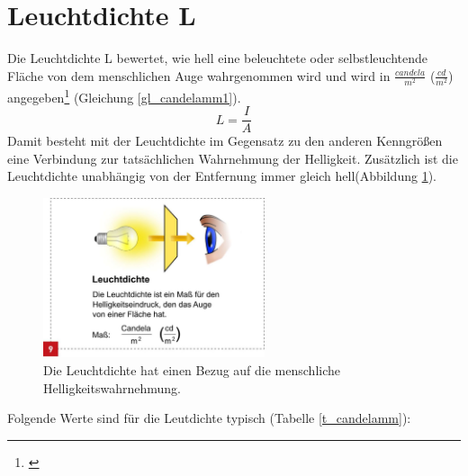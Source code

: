 \section{Leuchtdichte L}\label{sec_candelamm}
Die Leuchtdichte L bewertet, wie hell eine beleuchtete oder selbstleuchtende Fläche von dem menschlichen Auge wahrgenommen wird und wird in $\frac{candela}{m^{2}}$ ($\frac{cd}{m^{2}}$) angegeben\footnote{\cite[34]{ris}} (Gleichung \ref{gl_candelamm1}).
 \begin{equation}\label{gl_candelamm1}
	L=\frac{I}{A}	
\end{equation}
Damit besteht mit der Leuchtdichte im Gegensatz zu den anderen Kenngrößen eine Verbindung zur tatsächlichen Wahrnehmung der Helligkeit. Zusätzlich ist die Leuchtdichte unabhängig von der Entfernung immer gleich hell(Abbildung \ref{b_candelamm}).

 \begin{figure}[H]     %
\centering
\includegraphics[width=0.58\textwidth]{bilder/candelamm} 
\caption {Die Leuchtdichte hat einen Bezug auf die menschliche Helligkeitswahrnehmung\protect\footnotemark .}\label{b_candelamm}
\end{figure}

\noindent Folgende Werte sind für die Leutdichte typisch (Tabelle \ref{t_candelamm}):

